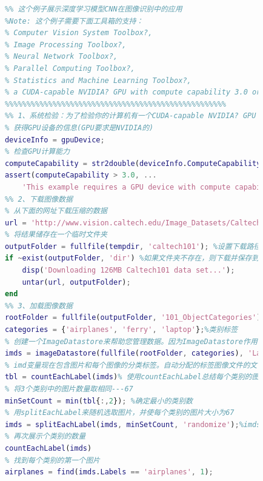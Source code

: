             \begin{lstlisting}[language = Matlab]
            %%%%%%%%%%%%%%%%%%%%%%%%%%%%%%%%%%%%%%%%%%%%%%%%%%%
            %% 这个例子展示深度学习模型CNN在图像识别中的应用
            %Note: 这个例子需要下面工具箱的支持：
            % Computer Vision System Toolbox?,
            % Image Processing Toolbox?,
            % Neural Network Toolbox?,
            % Parallel Computing Toolbox?,
            % Statistics and Machine Learning Toolbox?,
            % a CUDA-capable NVIDIA? GPU with compute capability 3.0 or higher.
            %%%%%%%%%%%%%%%%%%%%%%%%%%%%%%%%%%%%%%%%%%%%%%%%%%%
            %% 1、系统检验：为了检验你的计算机有一个CUDA-capable NVIDIA? GPU with compute capability 3.0 or higher.
            % 获得GPU设备的信息(GPU要求是NVIDIA的)
            deviceInfo = gpuDevice;
            % 检查GPU计算能力
            computeCapability = str2double(deviceInfo.ComputeCapability);
            assert(computeCapability > 3.0, ...
                'This example requires a GPU device with compute capability 3.0 or higher.')
            %% 2、下载图像数据
            % 从下面的网址下载压缩的数据
            url = 'http://www.vision.caltech.edu/Image_Datasets/Caltech101/101_ObjectCategories.tar.gz';
            % 将结果储存在一个临时文件夹
            outputFolder = fullfile(tempdir, 'caltech101'); %设置下载路径(图像数据下载在哪里)
            if ~exist(outputFolder, 'dir') %如果文件夹不存在，则下载并保存到该文件夹路径
                disp('Downloading 126MB Caltech101 data set...');
                untar(url, outputFolder);
            end
            %% 3、加载图像数据
            rootFolder = fullfile(outputFolder, '101_ObjectCategories');
            categories = {'airplanes', 'ferry', 'laptop'};%类别标签
            % 创建一个ImageDatastore来帮助您管理数据。因为ImageDatastore作用于图像文件位置,图像不加载到内存中,直到读,使其有效使用大型图像集合。
            imds = imageDatastore(fullfile(rootFolder, categories), 'LabelSource', 'foldernames');
            % imd变量现在包含图片和每个图像的分类标签。自动分配的标签图像文件的文件夹的名称。
            tbl = countEachLabel(imds)% 使用countEachLabel总结每个类别的图片数量。
            % 将3个类别中的图片数量取相同---67
            minSetCount = min(tbl{:,2}); %确定最小的类别数
            % 用splitEachLabel来随机选取图片，并使每个类别的图片大小为67
            imds = splitEachLabel(imds, minSetCount, 'randomize');%imds包含图片和类别
            % 再次展示个类别的数量
            countEachLabel(imds)
            % 找到每个类别的第一个图片
            airplanes = find(imds.Labels == 'airplanes', 1);

\end{lstlisting}
